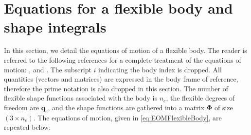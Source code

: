 \documentclass[wes, manuscript]{copernicus}
\renewcommand{\v}[1]{\boldsymbol{#1}}
\newcommand{\m}[1]{\boldsymbol{#1}}
\begin{document}
\appendix


\section{Equations for a flexible body and shape integrals}
\label{sec:FlexibleDefinitions}
In this section, we detail the equations of motion of a flexible body. 
The reader is referred to the following references for a complete treatment of the equations of motion: \cite{shabana:book}, \cite{Schwertassek:book} and \cite{Wallrapp:1994}.
% 
% 
% 
The subscript $i$ indicating the body index is dropped.
All quantities (vectors and matrices) are expressed in the body frame of reference, therefore the prime notation is also dropped in this section.
The number of flexible shape functions associated with the body is $n_e$, the flexible degrees of freedom are $\v{q}_e$, and the shape functions are gathered into a matrix $\m{\Phi}$ of size $(3\times n_e)$. 
The equations of motion, given in \autoref{eq:EOMFlexibleBody}, are repeated below:
\end{document}
